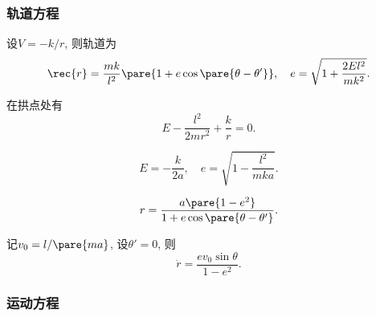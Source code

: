 \documentclass[../TheoreticalMechanics.tex]{subfiles}
\begin{document}
\subsubsection{轨道方程} %
\label{ssub:轨道方程}
\begin{finale}
	\begin{theorem}[圆锥曲线轨道方程]
        \label{thm:圆锥曲线轨道方程}
		设$V=-k/r$, 则轨道为
		\[ \rec{r} = \frac{mk}{l^2}\pare{1+e\cos\pare{\theta-\theta'}},\quad  e = \sqrt{1+\frac{2El^2}{mk^2}}. \]		
	\end{theorem}
\end{finale}
\begin{lemma}[拱点处的能量]
	在拱点处有
	\[ E - \frac{l^2}{2mr^2} + \frac{k}{r} = 0. \]
\end{lemma}
\begin{corollary}[能量-半长轴关系]\quad
	\[ E = -\frac{k}{2a},\quad e = \sqrt{1-\frac{l^2}{mka}}. \]
\end{corollary}
\begin{corollary}[轨道的另一形式]\quad
	\[ r = \frac{a\pare{1-e^2}}{1+e\cos\pare{\theta-\theta'}}. \]
\end{corollary}
\begin{corollary}[径向速度]
	记$v_0=l/\pare{ma}$, 设$\theta'=0$, 则
	\[ \dot{r} = \frac{ev_0\sin\theta}{1-e^2}. \]
\end{corollary}


\subsubsection{运动方程} %
\label{ssub:运动方程}
\end{document}
